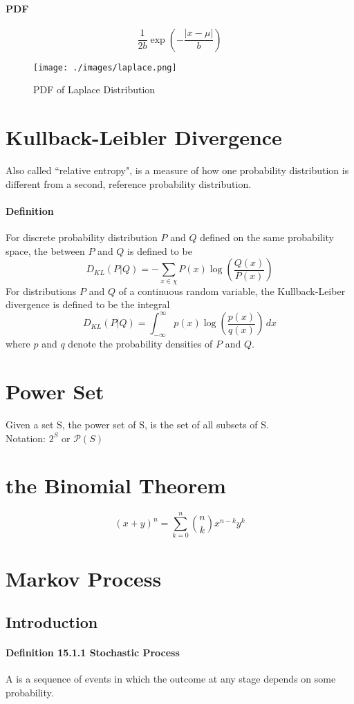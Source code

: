 \documentclass[11pt]{article}
\begin{document}
\paragraph{PDF}
$$\frac{1}{2b}\exp(-\frac{|x-\mu|}{b})$$
\begin{figure}[h]
	\centering
	\texttt{[image: ./images/laplace.png]}
	\caption{PDF of Laplace Distribution}
\end{figure}

\section{Kullback-Leibler Divergence}
Also called ``relative entropy", is a measure of how one probability distribution is different from a second, reference probability distribution.
\paragraph{Definition}
For discrete probability distribution $P$ and $Q$ defined on the same probability space, the  between $P$ and $Q$ is defined to be
$$D_{KL}(P|Q) = - \sum_{x \in \chi} P(x)\log(\frac{Q(x)}{P(x)})$$
For distributions $P$ and $Q$ of a continuous random variable, the Kullback-Leiber divergence is defined to be the integral
$$D_{KL}(P|Q) = \int_{-\infty}^\infty p(x)\log(\frac{p(x)}{q(x)})\, dx$$ where $p$ and $q$ denote the probability densities of $P$ and $Q$.

\section{Power Set}
Given a set S, the power set of S, is the set of all subsets of S. \\
Notation: $2^S$ or $\mathcal{P}(S)$

\section{the Binomial Theorem}
$$(x+y)^n = \sum_{k=0}^n \binom{n}{k} x^{n-k}y^k$$

\section{Markov Process}
\subsection{Introduction}
\paragraph{Definition 15.1.1 Stochastic Process}
A  is a sequence of events in which the outcome at any stage depends on some probability.
\end{document}
